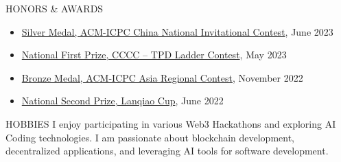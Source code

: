 \documentclass{resume} %
\begin{document}
\begin{rSection}{HONORS \& AWARDS}
\begin{itemize}
\setlength\itemsep{-0.5em}
\item \href{https://jixiangli.xyz/awards/2024-ICPC-China-National-Invitational-Contest-Jixiang-Li-MEDAL.pdf}{Silver Medal, ACM-ICPC China National Invitational Contest}, June 2023
\item \href{https://jixiangli.xyz/awards/CCCC-TPD-Ladder-Contest.pdf}{National First Prize, CCCC -- TPD Ladder Contest}, May 2023
\item \href{https://jixiangli.xyz/awards/2023-Asia-Xian-Regional-Contest-Jixiang-Li-MEDAL.pdf}{Bronze Medal, ACM-ICPC Asia Regional Contest}, November 2022
\item \href{https://jixiangli.xyz/awards/Lanqiao-Cup.jpg}{National Second Prize, Lanqiao Cup}, June 2022
\end{itemize}
\end{rSection}


\begin{rSection}{HOBBIES}
I enjoy participating in various Web3 Hackathons and exploring AI Coding technologies. I am passionate about blockchain development, decentralized applications, and leveraging AI tools for software development.
\end{rSection}
\end{document}

